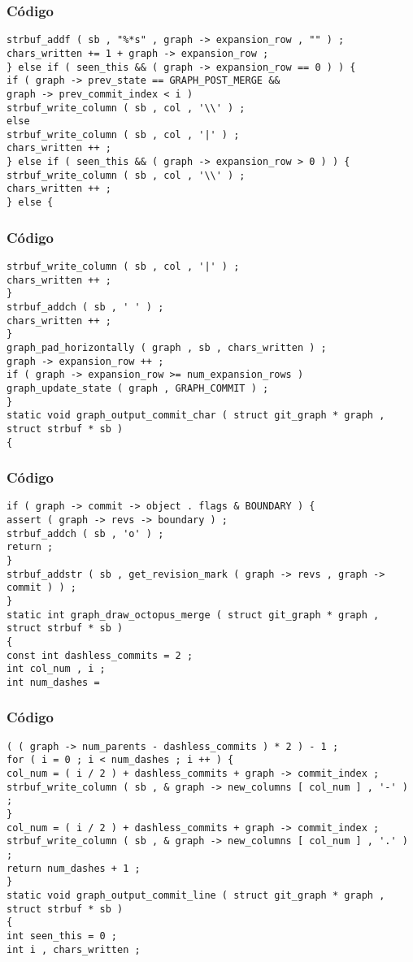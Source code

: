 \documentclass{beamer}
\begin{document}
\begin{frame}[fragile]
\frametitle{C\'odigo}
\begin{verbatim}
strbuf_addf ( sb , "%*s" , graph -> expansion_row , "" ) ; 
chars_written += 1 + graph -> expansion_row ; 
} else if ( seen_this && ( graph -> expansion_row == 0 ) ) { 
if ( graph -> prev_state == GRAPH_POST_MERGE && 
graph -> prev_commit_index < i ) 
strbuf_write_column ( sb , col , '\\' ) ; 
else 
strbuf_write_column ( sb , col , '|' ) ; 
chars_written ++ ; 
} else if ( seen_this && ( graph -> expansion_row > 0 ) ) { 
strbuf_write_column ( sb , col , '\\' ) ; 
chars_written ++ ; 
} else { 
\end{verbatim}
\end{frame}
\begin{frame}[fragile]
\frametitle{C\'odigo}
\begin{verbatim}
strbuf_write_column ( sb , col , '|' ) ; 
chars_written ++ ; 
} 
strbuf_addch ( sb , ' ' ) ; 
chars_written ++ ; 
} 
graph_pad_horizontally ( graph , sb , chars_written ) ; 
graph -> expansion_row ++ ; 
if ( graph -> expansion_row >= num_expansion_rows ) 
graph_update_state ( graph , GRAPH_COMMIT ) ; 
} 
static void graph_output_commit_char ( struct git_graph * graph , struct strbuf * sb ) 
{ 
\end{verbatim}
\end{frame}
\begin{frame}[fragile]
\frametitle{C\'odigo}
\begin{verbatim}
if ( graph -> commit -> object . flags & BOUNDARY ) { 
assert ( graph -> revs -> boundary ) ; 
strbuf_addch ( sb , 'o' ) ; 
return ; 
} 
strbuf_addstr ( sb , get_revision_mark ( graph -> revs , graph -> commit ) ) ; 
} 
static int graph_draw_octopus_merge ( struct git_graph * graph , 
struct strbuf * sb ) 
{ 
const int dashless_commits = 2 ; 
int col_num , i ; 
int num_dashes = 
\end{verbatim}
\end{frame}
\begin{frame}[fragile]
\frametitle{C\'odigo}
\begin{verbatim}
( ( graph -> num_parents - dashless_commits ) * 2 ) - 1 ; 
for ( i = 0 ; i < num_dashes ; i ++ ) { 
col_num = ( i / 2 ) + dashless_commits + graph -> commit_index ; 
strbuf_write_column ( sb , & graph -> new_columns [ col_num ] , '-' ) ; 
} 
col_num = ( i / 2 ) + dashless_commits + graph -> commit_index ; 
strbuf_write_column ( sb , & graph -> new_columns [ col_num ] , '.' ) ; 
return num_dashes + 1 ; 
} 
static void graph_output_commit_line ( struct git_graph * graph , struct strbuf * sb ) 
{ 
int seen_this = 0 ; 
int i , chars_written ; 
\end{verbatim}
\end{frame}
\end{document}

